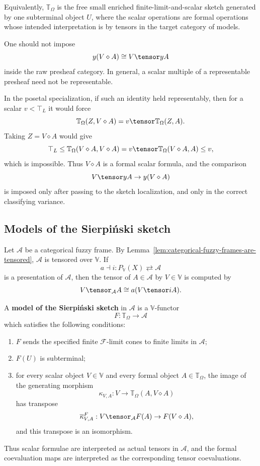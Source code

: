 Equivalently, \(\mathbb T_{\Omega}\) is the free small enriched
finite-limit-and-scalar sketch generated by one subterminal object \(U\), where the
scalar operations are formal operations whose intended interpretation is by tensors
in the target category of models.

\begin{remark}
\label{rem:formal-scalar-objects}
One should not impose
\[
    y(V\diamond A)\cong V\tensor yA
\]
inside the raw presheaf category. In general, a scalar multiple of a representable
presheaf need not be representable.

In the posetal specialization, if such an identity held representably, then for a
scalar \(v<\top_L\) it would force
\[
    \mathbb T_{\Omega}(Z,V\diamond A)
    =
    v\tensor \mathbb T_{\Omega}(Z,A).
\]
Taking \(Z=V\diamond A\) would give
\[
    \top_L
    \leq
    \mathbb T_{\Omega}(V\diamond A,V\diamond A)
    =
    v\tensor \mathbb T_{\Omega}(V\diamond A,A)
    \leq
    v,
\]
which is impossible. Thus \(V\diamond A\) is a formal scalar formula, and the
comparison
\[
    V\tensor yA\to y(V\diamond A)
\]
is imposed only after passing to the sketch localization, and only in the correct
classifying variance.
\end{remark}

\subsection{Models of the Sierpiński sketch}
\label{subsec:models-sierpinski-sketch}

Let \(\mathcal A\) be a categorical fuzzy frame. By
Lemma~\ref{lem:categorical-fuzzy-frames-are-tensored}, \(\mathcal A\) is tensored
over \(\mathbb V\). If
\[
    a\dashv i:
    P_{\mathbb V}(X)\rightleftarrows\mathcal A
\]
is a presentation of \(\mathcal A\), then the tensor of \(A\in\mathcal A\) by
\(V\in\mathbb V\) is computed by
\[
    V\tensor_{\mathcal A}A
    \cong
    a(V\tensor iA).
\]

A \textbf{model of the Sierpiński sketch} in \(\mathcal A\) is a
\(\mathbb V\)-functor
\[
    F:\mathbb T_{\Omega}\to\mathcal A
\]
which satisfies the following conditions:
\begin{enumerate}
    \item \(F\) sends the specified finite \(\mathcal F\)-limit cones to finite
    limits in \(\mathcal A\);

    \item \(F(U)\) is subterminal;

    \item for every scalar object \(V\in\mathbb V\) and every formal object
    \(A\in\mathbb T_{\Omega}\), the image of the generating morphism
    \[
        \kappa_{V,A}:
        V\to \mathbb T_{\Omega}(A,V\diamond A)
    \]
    has transpose
    \[
        \overline{\kappa}^{F}_{V,A}:
        V\tensor_{\mathcal A}F(A)\to F(V\diamond A),
    \]
    and this transpose is an isomorphism.
\end{enumerate}
Thus scalar formulae are interpreted as actual tensors in \(\mathcal A\), and the
formal coevaluation maps are interpreted as the corresponding tensor
coevaluations.


